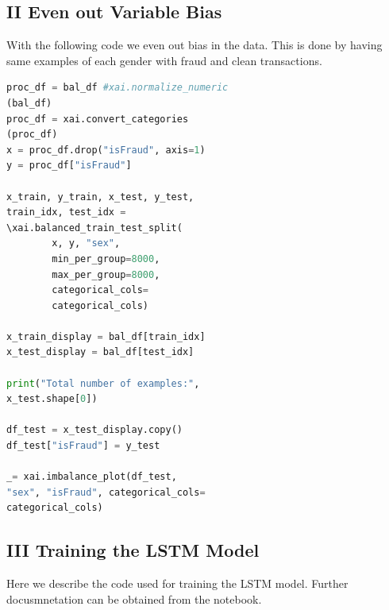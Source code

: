 \documentclass[jou,apacite]{apa6}
\begin{document}
\subsection{II Even out Variable Bias}
With the following code we even out bias in the data. This is done by having same examples of each gender with fraud and clean transactions.\par

\begin{lstlisting}[language=Python]
proc_df = bal_df #xai.normalize_numeric
(bal_df)
proc_df = xai.convert_categories
(proc_df)
x = proc_df.drop("isFraud", axis=1)
y = proc_df["isFraud"]

x_train, y_train, x_test, y_test, 
train_idx, test_idx = 
\xai.balanced_train_test_split(
        x, y, "sex", 
        min_per_group=8000,
        max_per_group=8000,
        categorical_cols=
        categorical_cols)

x_train_display = bal_df[train_idx]
x_test_display = bal_df[test_idx]

print("Total number of examples:", 
x_test.shape[0])

df_test = x_test_display.copy()
df_test["isFraud"] = y_test

_= xai.imbalance_plot(df_test, 
"sex", "isFraud", categorical_cols=
categorical_cols)
\end{lstlisting}

\subsection{III Training the LSTM Model}
Here we describe the code used for training the LSTM model. Further docusmnetation can be obtained from the notebook.\par
\end{document}
